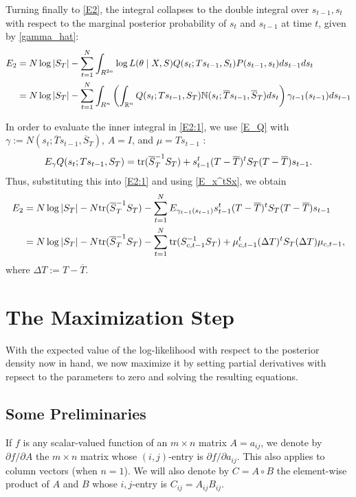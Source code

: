 \documentclass[12pt,leqno]{article}
\begin{document}
Turning finally to  \eqref{E2}, the integral collapses to the double integral over $s_{t-1},s_t$ with respect to the
marginal posterior probability of $s_t$ and $s_{t-1}$ at time $t$, given by \eqref{gamma_hat}:
\begin{equation}\label{E2:1}
  \begin{split}
    E_2 &= N\log|S_T| - \sum_{t=1}^N\int_{R^{2n}}\log{L(\theta\mid X,S)}Q(s_t;Ts_{t-1},S_t)P(s_{t-1},s_t)ds_{t-1}ds_t\\
   &= N\log|S_T| - \sum_{t=1}^N\int_{R^n}\left(\int_{{\mathbb R}^{n}}Q(s_t;Ts_{t-1},S_T)
   {\mathbb N}(s_t;\overline{T}s_{t-1},\overline{S}_T)ds_t\right)\gamma_{t-1}(s_{t-1})ds_{t-1}\\
  \end{split}
  \end{equation}

In order to evaluate the inner integral in \eqref{E2:1}, we use \eqref{E_Q} 
with $\gamma := N(s_t;\overline{T}s_{t-1},\overline{S}_T)$,  $A = I$,  and $ \mu = Ts_{t-1}$ :
$$
E_{\gamma}Q(s_t;Ts_{t-1},S_T) = \text{\rm tr}(\overline{S}_T^{-1}S_T) + s_{t-1}^t(T - \overline{T})^tS_T(T - \overline{T})s_{t-1}.
$$
Thus, substituting this into \eqref{E2:1} and using \eqref{E_x^tSx}, we obtain
\begin{equation}\label{E2:2}
  \begin{split}
    E_2 &= N\log|S_T| - N\text{\rm tr}(\overline{S}_T^{-1}S_T) - \sum_{t=1}^N E_{\gamma_{t-1}(s_{t-1})}s_{t-1}^t(T - \overline{T})^t
    S_T(T - \overline{T})s_{t-1} \\
    &= N\log|S_T| - N\text{\rm tr}(\overline{S}_T^{-1}S_T) -\sum_{t=1}^N \text{\rm tr}(S_{c,t-1}^{-1}S_T) + \mu_{c,t-1}^t(\Delta{T})^tS_T
    (\Delta{T})\mu_{c,t-1},
  \end{split}
\end{equation}
where $\Delta{T} := T - \overline{T}$.
\section{The Maximization Step} \label{maximization}
With the expected value of the log-likelihood with respect to the posterior density now in hand, we now maximize
it by setting partial derivatives with repsect to the parameters to zero and solving the resulting equations.

\subsection{Some Preliminaries}
If $f$ is any scalar-valued function of an $m\times{n}$ matrix $A = a_{ij}$, we denote by $\partial{f}/\partial{A}$ the 
$m\times{n}$ matrix whose $(i,j)$-entry is $\partial{f}/\partial{a_{ij}}$.  This also applies to column vectors
(when $n=1$). We will also denote by $C = A\circ{B}$ the element-wise product of $A$ and $B$ whose $i,j$-entry is
$C_{ij} = A_{ij}B_{ij}$.
\end{document}
